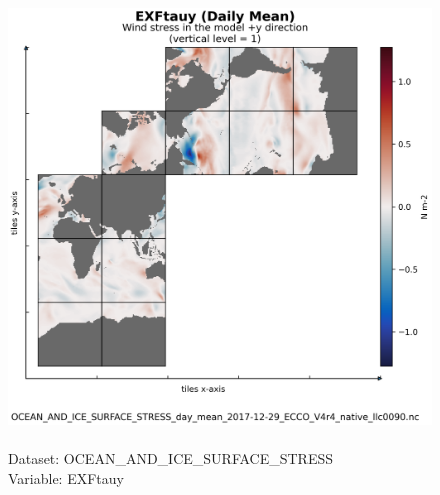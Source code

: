 \begin{figure}[H]
\centering
\includegraphics[scale=0.5]{../images/plots/native_plots/Ocean_and_Sea-Ice_Surface_Stress/EXFtauy.png}
\caption{\\Dataset: OCEAN\_AND\_ICE\_SURFACE\_STRESS\\Variable: EXFtauy}
\label{tab:table-OCEAN_AND_ICE_SURFACE_STRESS_EXFtauy-Plot}
\end{figure}
\pagebreak

